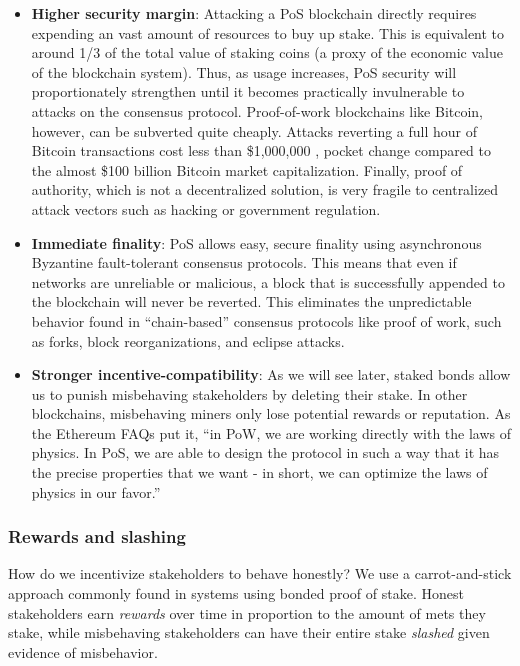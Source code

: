 \documentclass[headinclude]{scrbook}
\begin{document}
\begin{itemize}
    \item \textbf{Higher security margin}: Attacking a PoS blockchain directly requires expending an vast amount of resources to buy up stake. This is equivalent to around 1/3 of the total value of staking coins (a proxy of the economic value of the blockchain system). Thus, as usage increases, PoS  security will proportionately strengthen until it becomes practically invulnerable to attacks on the consensus protocol. Proof-of-work blockchains like Bitcoin, however, can be subverted quite cheaply. Attacks reverting a full hour of Bitcoin transactions cost less than \$1,000,000 \cite{crypto51}, pocket change compared to the almost \$100 billion Bitcoin market capitalization. Finally, proof of authority, which is not a decentralized solution, is very fragile to centralized attack vectors such as hacking or government regulation. 
    \item \textbf{Immediate finality}: PoS allows easy, secure finality using asynchronous Byzantine fault-tolerant consensus protocols. This means that even if networks are unreliable or malicious, a block that is successfully appended to the blockchain will never be reverted. This eliminates the unpredictable behavior found in ``chain-based'' consensus protocols like proof of work, such as forks, block reorganizations, and eclipse attacks.
    \item \textbf{Stronger incentive-compatibility}: As we will see later, staked bonds allow us to punish misbehaving stakeholders by deleting their stake. In other blockchains, misbehaving miners only lose potential rewards or reputation. As the Ethereum FAQs put it, ``in PoW, we are working directly with the laws of physics. In PoS, we are able to design the protocol in such a way that it has the precise properties that we want - in short, we can optimize the laws of physics in our favor.''
\end{itemize}

\subsubsection{Rewards and slashing}

How do we incentivize stakeholders to behave honestly? We use a carrot-and-stick approach commonly found in systems using bonded proof of stake. Honest stakeholders earn \textit{rewards} over time in proportion to the amount of mets they stake, while misbehaving stakeholders can have their entire stake \textit{slashed} given evidence of misbehavior.
\end{document}
